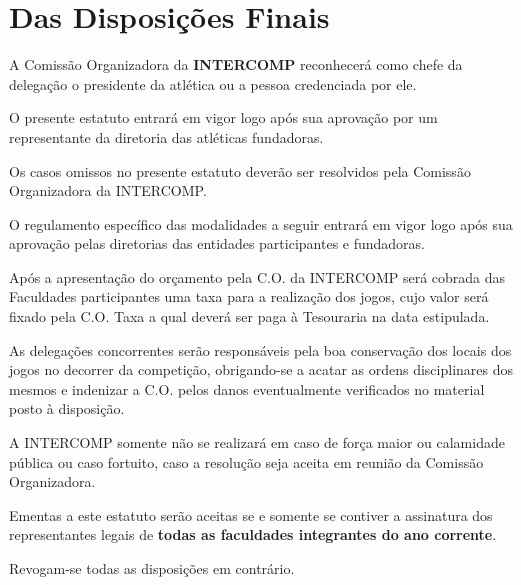 {\let\clearpage\relax \chapter{Das Disposições Finais}}

\begin{article}
	A Comissão Organizadora da \textbf{INTERCOMP} reconhecerá como chefe da delegação o presidente da atlética ou a pessoa credenciada por ele.
\end{article}

\begin{article}
	O presente estatuto entrará em vigor logo após sua aprovação por um representante da diretoria das atléticas fundadoras.
\end{article}

\begin{article}
	Os casos omissos no presente estatuto deverão ser resolvidos pela Comissão Organizadora da INTERCOMP.
\end{article}

\begin{article}
	O regulamento específico das modalidades a seguir entrará em vigor logo após sua aprovação pelas diretorias das entidades participantes e fundadoras.
\end{article}

\begin{article}
	Após a apresentação do orçamento pela C.O. da INTERCOMP será cobrada das Faculdades participantes uma taxa para a realização dos jogos, cujo valor será fixado pela C.O. Taxa a qual deverá ser paga à Tesouraria na data estipulada.
\end{article}

\begin{article}
	As delegações concorrentes serão responsáveis pela boa conservação dos locais dos jogos no decorrer da competição, obrigando-se a acatar as ordens disciplinares dos mesmos e indenizar a C.O. pelos danos eventualmente verificados no material posto à disposição.
\end{article}

\begin{article}
	A INTERCOMP somente não se realizará em caso de força maior ou calamidade pública ou caso fortuito, caso a resolução seja aceita em reunião da Comissão Organizadora.
\end{article}

\begin{article}
	Ementas a este estatuto serão aceitas se e somente se contiver a assinatura dos representantes legais de \textbf{todas as faculdades integrantes do ano corrente}.
\end{article}

\begin{article}
	Revogam-se todas as disposições em contrário.
\end{article}

